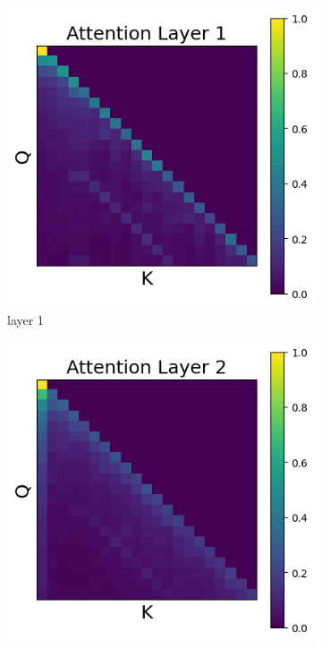 \documentclass[11pt]{article}
\begin{document}
\subsection{}\label{app:intervention1}
\begin{figure}[t]
  \begin{subfigure}[t]{0.24\textwidth}
    \centering
    \includegraphics[width=1.4\columnwidth]{figures/intervention1/layer_1.png}
    \caption{layer 1}
  \end{subfigure}\hfill
  \begin{subfigure}[t]{0.24\textwidth}
    \centering
    \includegraphics[width=1.4\columnwidth]{figures/intervention1/layer_2.png}

\end{subfigure}
\end{figure}
\end{document}
